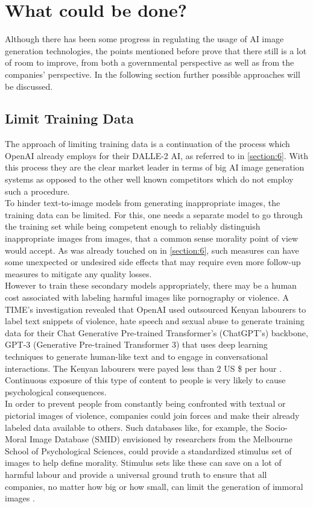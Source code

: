 \documentclass[10pt,twocolumn,twoside]{osajnl}
\begin{document}


\section{What could be done?}
Although there has been some progress in regulating the usage of AI image generation technologies, the points mentioned before prove 
that there still is a lot of room to improve, from both a governmental perspective as well as from the companies' perspective.
In the following section further possible approaches will be discussed.


\subsection{Limit Training Data}
The approach of limiting training data is a continuation of the process which OpenAI already employs for their DALLE-2 AI, as referred to in \ref{section:6}.
With this process they are the clear market leader in terms of big AI image generation systems as opposed to the other well known competitors which do not employ 
such a procedure. \\
To hinder text-to-image models from generating inappropriate images, the training data can be limited.
For this, one needs a separate model to go through the training set while being competent enough to reliably distinguish inappropriate images from images, that a common sense morality point of view would accept. 
As was already touched on in \ref{section:6}, such measures can have some unexpected or undesired side effects that may require even more follow-up measures to mitigate any quality losses. 
\\
However to train these secondary models appropriately, there may be a human cost associated with labeling harmful images like pornography or violence. 
A TIME's investigation revealed that OpenAI used outsourced Kenyan labourers to label text snippets of violence, hate speech 
and sexual abuse to generate training data for their Chat Generative Pre-trained Transformer's (ChatGPT’s) backbone, GPT-3 (Generative Pre-trained Transformer 3) 
that uses deep learning techniques to generate human-like text and to engage in conversational interactions. 
The Kenyan labourers were payed less than 2 US \$ per hour \cite{KenyaExclusive}. 
Continuous exposure of this type of content to people is very likely to cause psychological consequences. \\
In order to prevent people from constantly being confronted with textual or pictorial images of violence, companies could join forces and make their already labeled data available to others. 
Such databases like, for example, the Socio-Moral Image Database (SMID) envisioned by researchers from the Melbourne School of Psychological Sciences, could provide a standardized stimulus set of images to help define morality. 
Stimulus sets like these can save on a lot of harmful labour and provide a universal ground truth to ensure that all companies, no matter how big or how small, can limit the generation of immoral images \cite{Database}.
\end{document}

